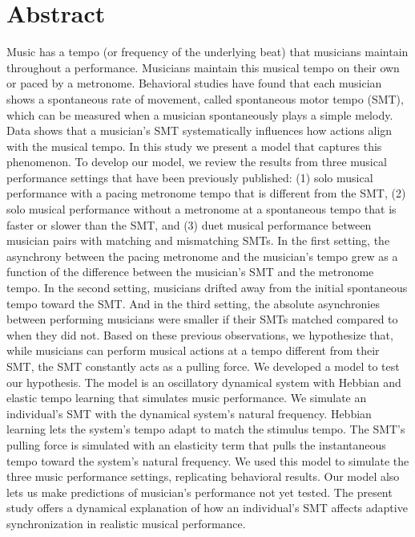 \documentclass{report}
\begin{document}
\section{Abstract}
Music has a tempo (or frequency of the underlying beat) that musicians maintain throughout a performance. Musicians maintain this musical tempo on their own or paced by a metronome. Behavioral studies have found that each musician shows a spontaneous rate of movement, called spontaneous motor tempo (SMT), which can be measured when a musician spontaneously plays a simple melody. Data shows that a musician's SMT systematically influences how actions align with the musical tempo. In this study we present a model that captures this phenomenon. To develop our model, we review the results from three musical performance settings that have been previously published: (1) solo musical performance with a pacing metronome tempo that is different from the SMT, (2) solo musical performance without a metronome at a spontaneous tempo that is faster or slower than the SMT, and (3) duet musical performance between musician pairs with matching and mismatching SMTs. In the first setting, the asynchrony between the pacing metronome and the musician's tempo grew as a function of the difference between the musician's SMT and the metronome tempo. In the second setting, musicians drifted away from the initial spontaneous tempo toward the SMT. And in the third setting, the absolute asynchronies between performing musicians were smaller if their SMTs matched compared to when they did not. Based on these previous observations, we hypothesize that, while musicians can perform musical actions at a tempo different from their SMT, the SMT constantly acts as a pulling force. We developed a model to test our hypothesis. The model is an oscillatory dynamical system with Hebbian and elastic tempo learning that simulates music performance. We simulate an individual's SMT with the dynamical system's natural frequency. Hebbian learning lets the system's tempo adapt to match the stimulus tempo. The SMT's pulling force is simulated with an elasticity term that pulls the instantaneous tempo toward the system's natural frequency. We used this model to simulate the three music performance settings, replicating behavioral results. Our model also lets us make predictions of musician's performance not yet tested. The present study offers a dynamical explanation of how an individual's SMT affects adaptive synchronization in realistic musical performance.
\end{document}
